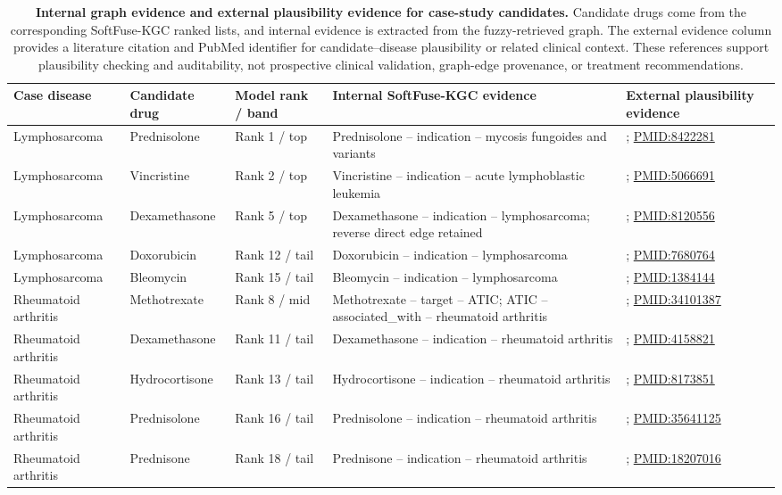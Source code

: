 \documentclass[pdflatex,sn-mathphys-num]{sn-jnl}
\newcommand{\pmid}[1]{\href{https://pubmed.ncbi.nlm.nih.gov/#1/}{PMID:#1}}
\newcommand{\softfuse}{SoftFuse-KGC}
\begin{document}
\begin{table}[!tp]
\caption{\textbf{Internal graph evidence and external plausibility evidence for case-study candidates.} Candidate drugs come from the corresponding \softfuse{} ranked lists, and internal evidence is extracted from the fuzzy-retrieved graph. The external evidence column provides a literature citation and PubMed identifier for candidate--disease plausibility or related clinical context. These references support plausibility checking and auditability, not prospective clinical validation, graph-edge provenance, or treatment recommendations.}
\label{tab:case_evidence}
\centering
{\fontsize{8.4pt}{9.25pt}\selectfont
\setlength{\tabcolsep}{2.4pt}
\renewcommand{\arraystretch}{1.13}
\begin{tabularx}{0.995\textwidth}{@{}>{\raggedright\arraybackslash}p{}>{\raggedright\arraybackslash}p{}>{\raggedright\arraybackslash}p{}>{\raggedright\arraybackslash}X>{\raggedright\arraybackslash}p{}@{}}
\toprule
Case disease & Candidate drug & Model rank / band & Internal \softfuse{} evidence & External plausibility evidence \\
\midrule
Lymphosarcoma & Prednisolone & Rank 1 / top & Prednisolone -- indication -- mycosis fungoides and variants & \citep{sweetenham1993pacet}; \pmid{8422281} \\
Lymphosarcoma & Vincristine & Rank 2 / top & Vincristine -- indication -- acute lymphoblastic leukemia & \citep{bagley1972lymphosarcoma}; \pmid{5066691} \\
Lymphosarcoma & Dexamethasone & Rank 5 / top & Dexamethasone -- indication -- lymphosarcoma; reverse direct edge retained & \citep{mclaughlin1994fnd}; \pmid{8120556} \\
Lymphosarcoma & Doxorubicin & Rank 12 / tail & Doxorubicin -- indication -- lymphosarcoma & \citep{fisher1993chop}; \pmid{7680764} \\
Lymphosarcoma & Bleomycin & Rank 15 / tail & Bleomycin -- indication -- lymphosarcoma & \citep{bayer1992bleomycin}; \pmid{1384144} \\
\midrule
Rheumatoid arthritis & Methotrexate & Rank 8 / mid & Methotrexate -- target -- ATIC; ATIC -- associated\_with -- rheumatoid arthritis & \citep{fraenkel20212021}; \pmid{34101387} \\
Rheumatoid arthritis & Dexamethasone & Rank 11 / tail & Dexamethasone -- indication -- rheumatoid arthritis & \citep{jick1965dexamethasone}; \pmid{4158821} \\
Rheumatoid arthritis & Hydrocortisone & Rank 13 / tail & Hydrocortisone -- indication -- rheumatoid arthritis & \citep{blyth1994rheumatoidknee}; \pmid{8173851} \\
Rheumatoid arthritis & Prednisolone & Rank 16 / tail & Prednisolone -- indication -- rheumatoid arthritis & \citep{boers2022gloria}; \pmid{35641125} \\
Rheumatoid arthritis & Prednisone & Rank 18 / tail & Prednisone -- indication -- rheumatoid arthritis & \citep{buttgereit2008capra1}; \pmid{18207016} \\
\bottomrule
\end{tabularx}}
\renewcommand{\arraystretch}{1.0}
\end{table}
\end{document}
